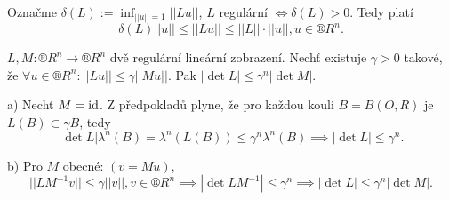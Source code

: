 \documentclass[12pt]{article}					%
\begin{document}
\begin{poznamka}
	Označme $\delta(L) := \inf_{||u|| = 1} ||L u||$, $L$ regulární $\Leftrightarrow \delta(L) > 0$. Tedy platí
	$$ \delta(L) ||u|| ≤ ||L u|| ≤ ||L||·||u||, u \in ®R^n. $$
\end{poznamka}

\begin{tvrzeni}
	$L, M: ®R^n \rightarrow ®R^n$ dvě regulární lineární zobrazení. Nechť existuje $\gamma > 0$ takové, že $\forall u \in ®R^n: ||Lu|| ≤ \gamma ||Mu||$. Pak $|\det L| ≤ \gamma^n |\det M|$.

	\begin{dukazin}
		a) Nechť $M = \operatorname{id}$. Z předpokladů plyne, že pro každou kouli $B = B(O, R)$ je $L(B) \subset \gamma B$, tedy
		$$ |\det L|\lambda^n(B) = \lambda^n(L(B)) ≤ \gamma^n \lambda^n(B) \implies |\det L| ≤ \gamma^n. $$

		b) Pro $M$ obecné: $(v = Mu)$,
		$$ ||LM^{-1} v|| ≤ \gamma ||v||, v \in ®R^n \implies |\det LM^{-1}| ≤ \gamma^n \implies |\det L| ≤ \gamma^n|\det M|. $$
	\end{dukazin}
\end{tvrzeni}
\end{document}
